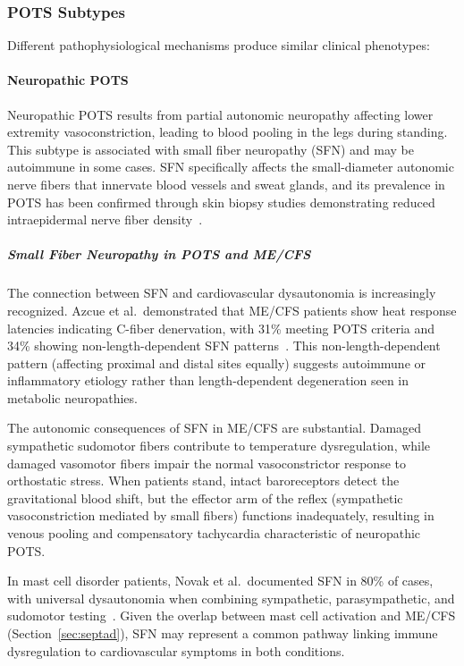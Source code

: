 \subsubsection{POTS Subtypes}
Different pathophysiological mechanisms produce similar clinical phenotypes:

\paragraph{Neuropathic POTS}
Neuropathic POTS results from partial autonomic neuropathy affecting lower extremity vasoconstriction, leading to blood pooling in the legs during standing. This subtype is associated with small fiber neuropathy (SFN) and may be autoimmune in some cases. SFN specifically affects the small-diameter autonomic nerve fibers that innervate blood vessels and sweat glands, and its prevalence in POTS has been confirmed through skin biopsy studies demonstrating reduced intraepidermal nerve fiber density~\cite{Azcue2023sfn}.

\subparagraph{Small Fiber Neuropathy in POTS and ME/CFS}
The connection between SFN and cardiovascular dysautonomia is increasingly recognized. Azcue et al.\ demonstrated that ME/CFS patients show heat response latencies indicating C-fiber denervation, with 31\% meeting POTS criteria and 34\% showing non-length-dependent SFN patterns~\cite{Azcue2023sfn}. This non-length-dependent pattern (affecting proximal and distal sites equally) suggests autoimmune or inflammatory etiology rather than length-dependent degeneration seen in metabolic neuropathies.

The autonomic consequences of SFN in ME/CFS are substantial. Damaged sympathetic sudomotor fibers contribute to temperature dysregulation, while damaged vasomotor fibers impair the normal vasoconstrictor response to orthostatic stress. When patients stand, intact baroreceptors detect the gravitational blood shift, but the effector arm of the reflex (sympathetic vasoconstriction mediated by small fibers) functions inadequately, resulting in venous pooling and compensatory tachycardia characteristic of neuropathic POTS.

In mast cell disorder patients, Novak et al.\ documented SFN in 80\% of cases, with universal dysautonomia when combining sympathetic, parasympathetic, and sudomotor testing~\cite{Novak2022}. Given the overlap between mast cell activation and ME/CFS (Section~\ref{sec:septad}), SFN may represent a common pathway linking immune dysregulation to cardiovascular symptoms in both conditions.

